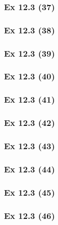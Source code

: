 \subsubsection{Ex 12.3 (37)}\label{sec:Ex_12.3.37}

\subsubsection{Ex 12.3 (38)}\label{sec:Ex_12.3.38}

\subsubsection{Ex 12.3 (39)}\label{sec:Ex_12.3.39}

\subsubsection{Ex 12.3 (40)}\label{sec:Ex_12.3.40}

\newpage		%

\subsubsection{Ex 12.3 (41)}\label{sec:Ex_12.3.41}

\subsubsection{Ex 12.3 (42)}\label{sec:Ex_12.3.42}

\subsubsection{Ex 12.3 (43)}\label{sec:Ex_12.3.43}

\subsubsection{Ex 12.3 (44)}\label{sec:Ex_12.3.44}

\subsubsection{Ex 12.3 (45)}\label{sec:Ex_12.3.45}

\subsubsection{Ex 12.3 (46)}\label{sec:Ex_12.3.46}

